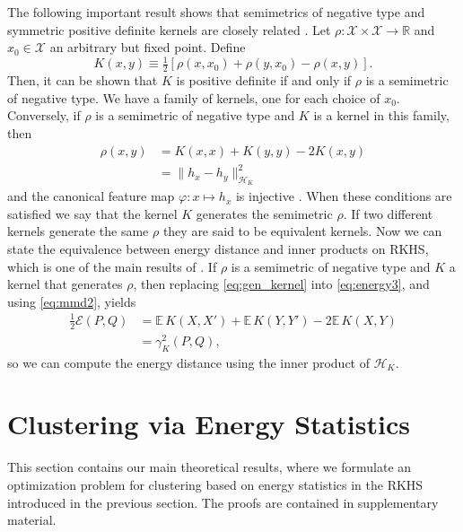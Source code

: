 \documentclass[twoside]{article}
\newcommand\Energy{\mathcal{E}}
\newcommand\E{\mathbb{E}}
\newcommand\kk{K}
\newcommand\kkk{h}
\newcommand\Hk{{\mathcal{H}}_{\kk}}
\begin{document}
The following important result shows that semimetrics of negative
type and symmetric positive definite kernels are closely related
\citep{Berg1984}. Let $\rho: \mathcal{X} \times \mathcal{X} \to \mathbb{R}$
and $x_0 \in \mathcal{X}$ an arbitrary but fixed point.
Define
\begin{equation}
\label{eq:kernel_semimetric}
\kk(x,y) \equiv 
\tfrac{1}{2} \left[  \rho(x,x_0) + \rho(y,x_0) - \rho(x,y)\right].
\end{equation}
Then, it can be shown that 
$\kk$ is positive definite if and only if $\rho$ is a semimetric
of negative type.
We have a family of kernels, one for each choice of $x_0$. Conversely,
if $\rho$ is a semimetric of negative type and $\kk$ is a kernel in this
family, then 
\begin{equation}
\label{eq:gen_kernel}
\begin{split}
\rho(x,y) &= \kk(x,x) + \kk(y,y) -2\kk(x,y) \\
&=  \| \kkk_x - \kkk_y \|^2_{\Hk}
\end{split}
\end{equation}
and the canonical feature map 
$\varphi: x \mapsto \kkk_x$ is injective \citep{Sejdinovic2013}.
When these conditions are satisfied we say that the kernel $\kk$ 
generates the semimetric $\rho$. 
If two different kernels generate the same $\rho$ they are
said to be equivalent kernels.
Now we can state the equivalence between energy distance and
inner products on RKHS, which is one of the main results of
\citep{Sejdinovic2013}. If $\rho$ is a semimetric
of negative type and $\kk$ a kernel that generates $\rho$, then
replacing \eqref{eq:gen_kernel} into
\eqref{eq:energy3}, and using \eqref{eq:mmd2}, yields
\begin{equation}
\label{eq:Erho}
\begin{split}
\tfrac{1}{2}\Energy(P, Q) &= 
\E \, \kk(X, X') + \E \, \kk(Y, Y') - 2\E \, \kk(X, Y) \\ 
&= \gamma_\kk^2(P,Q) ,
\end{split}
\end{equation}
so we can compute the energy distance using the inner product
of $\Hk$.


\section{Clustering via Energy Statistics}
\label{sec:clustering_theory}

This section contains our main theoretical results, where 
we formulate an optimization problem for clustering 
based on energy statistics in the RKHS introduced in the previous section.
The proofs are contained in supplementary material.
\end{document}

